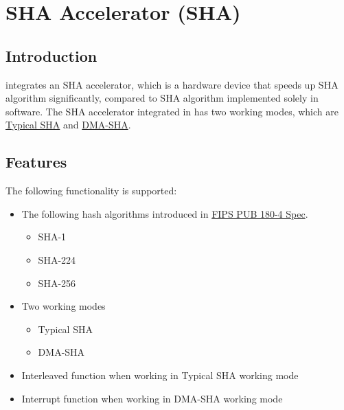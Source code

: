 \documentclass[main\_\_EN.tex]{subfiles}
\begin{document}

\ifglobal
\else
    {\let\clearpage\relax \listoftodos}
    \tableofcontents
\fi



\hypertarget{sha}{}
\chapter{SHA Accelerator (SHA)}
\label{mod:sha}
\section{Introduction}

\chipname{} integrates an SHA accelerator, which is a hardware device that speeds up SHA algorithm significantly, compared to SHA algorithm implemented solely in software. The SHA accelerator integrated in \chipname{} has two working modes, which are  \hyperref[sec:sha-typical-sha]{Typical SHA} and  \hyperref[sec:sha-dma-sha]{DMA-SHA}.

\section{Features}

The following functionality is supported:

\begin{itemize}
    \item The following hash algorithms introduced in   \href{https://doi.org/10.6028/NIST.FIPS.180-4}{FIPS PUB 180-4 Spec}.
    \begin{itemize}
        \item SHA-1
        \item SHA-224
        \item SHA-256
    \end{itemize}
    \item Two working modes
    \begin{itemize}
        \item Typical SHA 
        \item DMA-SHA  
    \end{itemize}
    \item Interleaved function when working in Typical SHA working mode
    \item Interrupt function when working in DMA-SHA working mode
\end{itemize}
\end{document}
